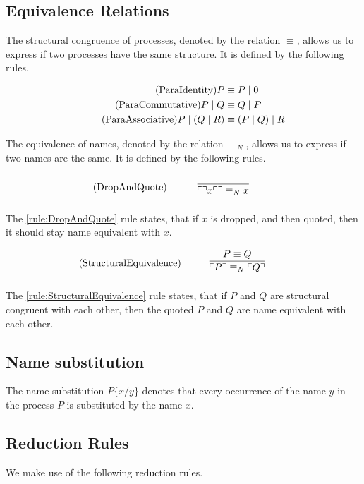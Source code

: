 \subsection{Equivalence Relations}
The structural congruence of processes, denoted by the relation $\equiv$, allows us to express if two processes have the same structure. It is defined by the following rules.

\begin{align*}
    \tag{ParaIdentity}P&\equiv P\mid 0\\
    \tag{ParaCommutative}P\mid Q &\equiv Q\mid P\\
    \tag{ParaAssociative}P\mid (Q\mid R)&\equiv (P\mid Q)\mid R
\end{align*}


\FloatBarrier

The equivalence of names, denoted by the relation $\equiv _N$, allows us to express if two names are the same. It is defined by the following rules.

\begin{align}
    \tag{DropAndQuote}\label{rule:DropAndQuote}\infrule{}{\quot{\drop{x}}\equiv _N x}
\end{align}

\noindent
The \ref{rule:DropAndQuote} rule states, that if $x$ is dropped, and then quoted, then it should stay name equivalent with $x$.

\begin{align}
    \tag{StructuralEquivalence}\label{rule:StructuralEquivalence}\infrule{P\equiv Q}{\quot{P} \equiv _N \quot{Q}}
\end{align}

\noindent
The \ref{rule:StructuralEquivalence} rule states, that if $P$ and $Q$ are structural congruent with each other, then the quoted $P$ and $Q$ are name equivalent with each other.

\FloatBarrier

\subsection{Name substitution} The name substitution $P\{x/y\}$ denotes that every occurrence of the name $y$ in the process $P$ is substituted by the name $x$.

\subsection{Reduction Rules}
We make use of the following reduction rules.

